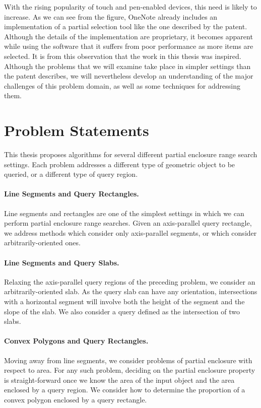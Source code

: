\noindent With the rising popularity of touch and pen-enabled devices, this need is likely to increase.  
As we can see from the figure, OneNote already includes an implementation of a partial selection tool like the one described by the patent. 
Although the details of the implementation are proprietary, it becomes apparent while using the software that it suffers from poor performance as more items are selected.
It is from this observation that the work in this thesis was inspired.  
Although the problems that we will examine take place in simpler settings than the patent describes, we will nevertheless develop an understanding of the major challenges of this problem domain, as well as some techniques for addressing them.


\section{Problem Statements}
\label{:intro:problems}

This thesis proposes algorithms for several different partial enclosure range search settings.  Each problem addresses a different type of geometric object to be queried, or a different type of query region.

\paragraph{Line Segments and Query Rectangles.} Line segments and rectangles are one of the simplest settings in which we can perform partial enclosure range searches. 
Given an axis-parallel query rectangle, we address methods which consider only axis-parallel segments, or which consider arbitrarily-oriented ones.

\paragraph{Line Segments and Query Slabs.} Relaxing the axis-parallel query regions of the preceding problem, we consider an arbitrarily-oriented slab.
As the query slab can have any orientation, intersections with a horizontal segment will involve both the height of the segment and the slope of the slab.  
We also consider a query defined as the intersection of two slabs.

\paragraph{Convex Polygons and Query Rectangles.} Moving away from line segments, we consider problems of partial enclosure with respect to area.  
For any such problem, deciding on the partial enclosure property is straight-forward once we know the area of the input object and the area enclosed by a query region.  
We consider how to determine the proportion of a convex polygon enclosed by a query rectangle.
 
